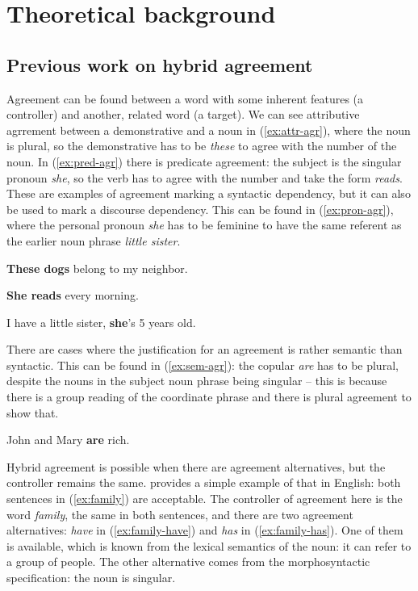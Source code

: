 \chapter{Theoretical background}
\startcontents[chapters]

\section{Previous work on hybrid agreement}
Agreement can be found  between a word with some inherent features (a controller) and another, related word (a target). We can see attributive agrrement between a demonstrative and a noun in (\ref{ex:attr-agr}), where the noun is plural, so the demonstrative has to be \textsl{these} to agree with the number of the noun. In (\ref{ex:pred-agr}) there is predicate agreement: the subject is the singular pronoun \textsl{she}, so the verb has to agree with the number and take the form \textsl{reads}. These are examples of agreement marking a syntactic dependency, but it can also be used to mark a discourse dependency. This can be found in (\ref{ex:pron-agr}), where the personal pronoun \textsl{she} has to be feminine to have the same referent as the earlier noun phrase \textsl{little sister}.

\begin{exe}
  \ex\label{ex:attr-agr}
  \textbf{These dogs} belong to my neighbor.

  \ex\label{ex:pred-agr}
  \textbf{She reads} every morning.

  \ex\label{ex:pron-agr}
  I have a little sister, \textbf{she}'s 5 years old.
\end{exe}

There are cases where the justification for an agreement is rather semantic than syntactic. This can be found in (\ref{ex:sem-agr}): the copular \textsl{are} has to be plural, despite the nouns in the subject noun phrase being singular -- this is because there is a group reading of the coordinate phrase and there is plural agreement to show that. 

\begin{exe}
  \ex\label{ex:sem-agr}
  John and Mary \textbf{are} rich.
\end{exe}

Hybrid agreement is possible when there are agreement alternatives, but the controller remains the same. \cite{corbett_agreement_2023} provides a simple example of that in English: both sentences in (\ref{ex:family}) are acceptable. The controller of agreement here is the word \textsl{family}, the same in both sentences, and there are two agreement alternatives: \textsl{have} in (\ref{ex:family-have}) and \textsl{has} in (\ref{ex:family-has}). One of them is available, which is known from the lexical semantics of the noun: it can refer to a group of people. The other alternative comes from the morphosyntactic specification: the noun is singular.

